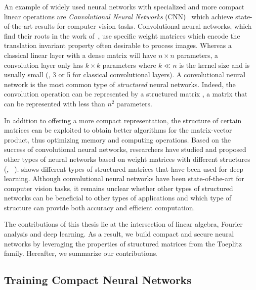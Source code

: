 An example of widely used neural networks with specialized and more compact linear operations are \emph{Convolutional Neural Networks} (CNN)~\cite{lecun1998gradient,krizhevsky2012imagenet,he2016deep,tan2019efficientnet} which achieve state-of-the-art results for computer vision tasks.
Convolutional neural networks, which find their roots in the work of~\citet{fukushima1982neocognitron}, use specific weight matrices which encode the translation invariant property often desirable to process images.
Whereas a classical linear layer with a dense matrix will have $n \times n$ parameters, a convolution layer only has $k \times k$ parameters where $k \ll n$ is the kernel size and is usually small (\eg, 3 or 5 for classical convolutional layers).
A convolutional neural network is the most common type of \emph{structured} neural networks.
Indeed, the convolution operation can be represented by a structured matrix \ie, a matrix that can be represented with less than $n^2$ parameters.


In addition to offering a more compact representation, the structure of certain matrices can be exploited to obtain better algorithms for the matrix-vector product, thus optimizing memory and computing operations.
Based on the success of convolutional neural networks, researchers have studied and proposed other types of neural networks based on weight matrices with different structures (\eg, ~\citet{moczulski2016acdc,sindhwani2015structured}).
 shows different types of structured matrices that have been used for deep learning.
Although convolutional neural networks have been state-of-the-art for computer vision tasks, it remains unclear whether other types of structured networks can be beneficial to other types of applications and which type of structure can provide both accuracy and efficient computation.

The contributions of this thesis lie at the intersection of linear algebra, Fourier analysis and deep learning.
As a result, we build compact and secure neural networks by leveraging the properties of structured matrices from the Toeplitz family.
Hereafter, we summarize our contributions.

\subsection{Training Compact Neural Networks}
\label{subsection:ch1-training_compact_neural_networks}


